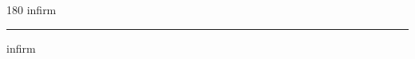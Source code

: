 
\begin{frame}
\begin{center}
\begin{turn}{180}
{\fontsize{2.5cm}{1em}\selectfont infirm}
\end{turn}
\vspace{1em}\par  
\hrule
\vspace{1em}\par  
{\fontsize{2.5cm}{1em}\selectfont infirm}
\end{center}
\end{frame}
